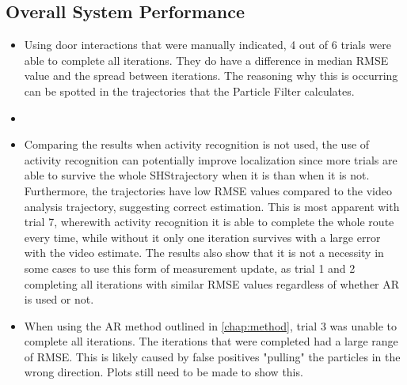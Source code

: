 \newpage
\subsection*{Overall System Performance}

\begin{itemize}
	\item Using door interactions that were manually indicated, 4 out of 6 trials were able to complete all iterations. They do have a difference in median RMSE value and the spread between iterations. The reasoning why this is occurring can be spotted in the trajectories that the Particle Filter calculates.  
	\item 
	
	\item Comparing the results when activity recognition is not used, the use of activity recognition can potentially improve localization since more trials are able to survive the whole \ac{SHS}trajectory when it is than when it is not. Furthermore, the trajectories have low RMSE values compared to the video analysis trajectory, suggesting correct estimation. This is most apparent with trial 7, wherewith activity recognition it is able to complete the whole route every time, while without it only one iteration survives with a large error with the video estimate. The results also show that it is not a necessity in some cases to use this form of measurement update, as trial 1 and 2 completing all iterations with similar RMSE values regardless of whether AR is used or not.
	\item When using the AR method outlined in \cref{chap:method}, trial 3 was unable to complete all iterations. The iterations that were completed had a large range of RMSE. This is likely caused by false positives "pulling" the particles in the wrong direction. Plots still need to be made to show this.
\end{itemize}




